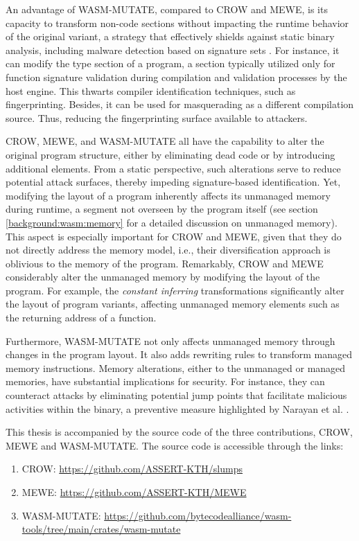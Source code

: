 An advantage of WASM-MUTATE, compared to CROW and MEWE, is its capacity to transform non-code sections without impacting the runtime behavior of the original variant, a strategy that effectively shields against static binary analysis, including malware detection based on signature sets \cite{EVASION}.
For instance, it can modify the type section of a \Wasm program, a section typically utilized only for function signature validation during compilation and validation processes by the host engine. 
This thwarts compiler identification techniques, such as fingerprinting.
Besides, it can be used for masquerading as a different compilation source.
Thus, reducing the fingerprinting surface available to attackers.


CROW, MEWE, and WASM-MUTATE all have the capability to alter the original program structure, either by eliminating dead code or by introducing additional elements. 
From a static perspective, such alterations serve to reduce potential attack surfaces, thereby impeding signature-based identification.
Yet, modifying the layout of a \Wasm program inherently affects its unmanaged memory during runtime, a segment not overseen by the \Wasm program itself (see section \autoref{background:wasm:memory} for a detailed discussion on unmanaged memory). 
This aspect is especially important for CROW and MEWE, given that they do not directly address the \Wasm memory model, i.e., their diversification approach is oblivious to the memory of the program. 
Remarkably, CROW and MEWE considerably alter the unmanaged memory by modifying the layout of the \Wasm program.
For example, the \emph{constant inferring} transformations significantly alter the layout of program variants, affecting unmanaged memory elements such as the returning address of a function.


Furthermore, WASM-MUTATE not only affects unmanaged memory through changes in the \Wasm program layout.
It also adds rewriting rules to transform managed memory instructions. 
Memory alterations, either to the unmanaged or managed memories, have substantial implications for security. 
For instance, they can counteract attacks by eliminating potential jump points that facilitate malicious activities within the binary, a preventive measure highlighted by Narayan et al. \cite{Swivel}.


This thesis is accompanied by the source code of the three contributions, CROW, MEWE and WASM-MUTATE. 
The source code is accessible through the links:
\begin{enumerate}
    \item CROW: \url{https://github.com/ASSERT-KTH/slumps}
    \item MEWE: \url{https://github.com/ASSERT-KTH/MEWE}
    \item WASM-MUTATE: \url{https://github.com/bytecodealliance/wasm-tools/tree/main/crates/wasm-mutate}
\end{enumerate}

